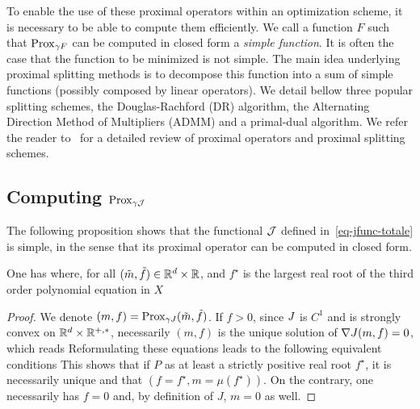 To enable the use of these proximal operators within an optimization scheme, it is necessary to be able to compute them efficiently. We call a function $F$ such that $\operatorname{Prox}_{\gamma F}$ can be computed in closed form a \textit{simple function}. It is often the case that the function to be minimized is not simple. The main idea underlying proximal splitting methods is to decompose this function into a sum of simple functions (possibly composed by linear operators). We detail bellow three popular splitting schemes, the Douglas-Rachford (DR) algorithm, the Alternating Direction Method of Multipliers (ADMM) and a primal-dual algorithm.  We refer the reader to~\cite{combettes-pesquet-review} for a detailed review of proximal operators and proximal splitting schemes. 


\subsection{Computing $\operatorname{Prox}_{\gamma \mathcal{J}}$}

The following proposition shows that the functional $\mathcal{J}$ defined in~\eqref{eq-jfunc-totale} is simple, in the sense that its proximal operator can be computed in closed form. 

\begin{prop}\label{proposition1}
	One has
	where, for all $(\tilde m,\tilde f) \in \mathbb{R}^d \times \mathbb{R}$, 
	and $f^\star$ is the largest real root of the third order polynomial equation in $X$
\end{prop}
\begin{proof}
	We denote $(m,f) = \operatorname{Prox}_{\gamma J}(\tilde m,\tilde f)$. 
	If $f > 0$, since $J$ is $C^1$ and is strongly convex on $\mathbb{R}^d \times \mathbb{R}^{+,*}$, necessarily $(m,f)$ is the unique solution of $\nabla J(m,f)=0$, which reads
	Reformulating these equations leads to the following equivalent conditions
	This shows that if $P$ as at least a strictly positive real root $f^\star$, it is necessarily unique and that $(f=f^\star,m=\mu(f^\star))$.
	On the contrary, one necessarily has $f=0$ and, by definition of $J$, $m=0$ as well.
\end{proof}



